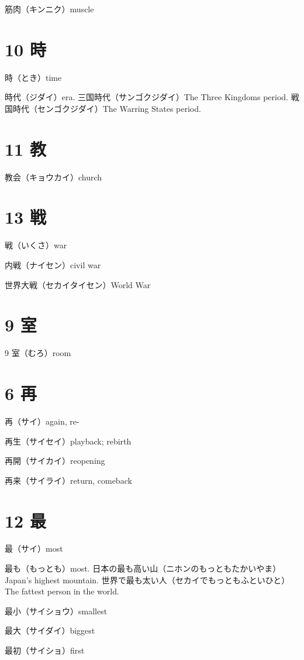 筋肉（キンニク）muscle

\section{10 時}

時（とき）time

時代（ジダイ）era.
三国時代（サンゴクジダイ）The Three Kingdoms period.
戦国時代（センゴクジダイ）The Warring States period.

\section{11 教}

教会（キョウカイ）church

\section{13 戦}

戦（いくさ）war

内戦（ナイセン）civil war

世界大戦（セカイタイセン）World War

\section{9 室}

9 室（むろ）room

\section{6 再}

再（サイ）again, re-

再生（サイセイ）playback; rebirth

再開（サイカイ）reopening

再来（サイライ）return, comeback

\section{12 最}

最（サイ）most

最も（もっとも）most.
日本の最も高い山（ニホンのもっともたかいやま）Japan's highest mountain.
世界で最も太い人（セカイでもっともふといひと）The fattest person in the world.

最小（サイショウ）smallest

最大（サイダイ）biggest

最初（サイショ）first

